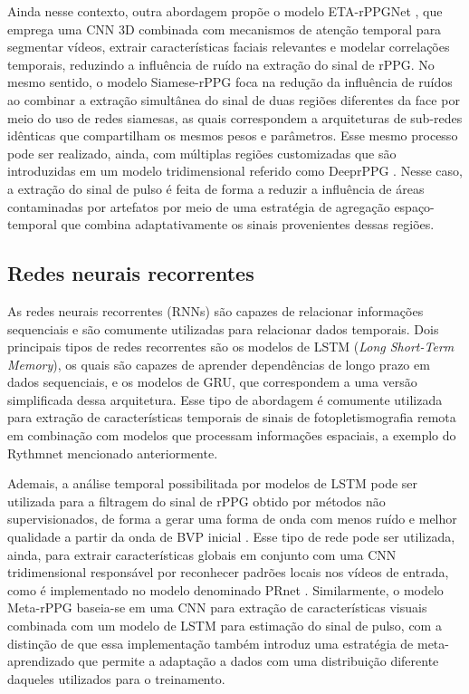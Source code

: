 Ainda nesse contexto, outra abordagem propõe o modelo ETA-rPPGNet \cite{hu2021eta}, que emprega uma CNN 3D combinada com mecanismos de atenção temporal para segmentar vídeos, extrair características faciais relevantes e modelar correlações temporais, reduzindo a influência de ruído na extração do sinal de rPPG. No mesmo sentido, o modelo Siamese-rPPG \cite{tsou2020siamese} foca na redução da influência de ruídos ao  combinar a extração simultânea do sinal de duas regiões diferentes da face por meio do uso de redes siamesas, as quais correspondem a arquiteturas de sub-redes idênticas que compartilham os mesmos pesos e parâmetros. Esse mesmo processo pode ser realizado, ainda, com múltiplas regiões customizadas que são introduzidas em um modelo tridimensional referido como DeeprPPG \cite{liu2020general}. Nesse caso, a extração do sinal de pulso é feita de forma a reduzir a influência de áreas contaminadas por artefatos por meio de uma estratégia de agregação espaço-temporal que combina adaptativamente os sinais provenientes dessas regiões.

\subsection{Redes neurais recorrentes}

As redes neurais recorrentes (RNNs) são capazes de relacionar informações sequenciais e são comumente utilizadas para relacionar dados temporais. Dois principais tipos de redes recorrentes são os modelos de LSTM (\textit{Long Short-Term Memory}), os quais são capazes de aprender dependências de longo prazo em dados sequenciais, e os modelos de GRU, que correspondem a uma versão simplificada dessa arquitetura. Esse tipo de abordagem é comumente utilizada para extração de características temporais de sinais de fotopletismografia remota em combinação com modelos que processam informações espaciais, a exemplo do Rythmnet \cite{niu2019rhythmnet} mencionado anteriormente. 

Ademais, a análise temporal possibilitada por modelos de LSTM pode ser utilizada para a filtragem do sinal de rPPG obtido por métodos não supervisionados, de forma a gerar uma forma de onda com menos ruído e melhor qualidade a partir da onda de BVP inicial \cite{bian2019accurate, botina2020long}. Esse tipo de rede pode ser utilizada, ainda, para extrair características globais em conjunto com uma CNN tridimensional responsável por reconhecer padrões locais nos vídeos de entrada, como é implementado no modelo denominado PRnet \cite{huang2021novel}. Similarmente, o modelo Meta-rPPG \cite{lee2020meta} baseia-se em uma CNN para extração de características visuais combinada com um modelo de LSTM para estimação do sinal de pulso, com a distinção de que essa implementação também introduz uma estratégia de meta-aprendizado que permite a adaptação a dados com uma distribuição diferente daqueles utilizados para o treinamento.

